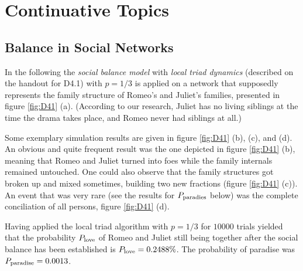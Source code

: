 \documentclass{scrartcl}
\begin{document}


\clearpage
\setcounter{section}{3}
\section{Continuative Topics}
\subsection{Balance in Social Networks}
In the following the \emph{social balance model} with \emph{local triad
dynamics} (described on the handout for D4.1) with $p = 1/3$ is applied on
a network that supposedly represents the family structure of Romeo's and
Juliet's families, presented in figure \ref{fig:D41} (a).  (According to
our research, Juliet has no living siblings at the time the drama takes
place, and Romeo never had siblings at all.)

Some exemplary simulation results are given in figure \ref{fig:D41} (b),
(c), and (d).
An obvious and quite frequent result was the one depicted in figure \ref{fig:D41}
(b), meaning that Romeo and Juliet turned into foes while the family
internals remained untouched.  One could also observe that the family
structures got broken up and mixed sometimes, building two new fractions
(figure \ref{fig:D41} (c)). An event that was very rare (see the results for
$P_{\mathrm{paradies}}$ below) was the complete conciliation of all persons,
figure \ref{fig:D41} (d).

Having applied the local triad algorithm with $p = 1/3$ for $10000$ trials
yielded that the probability $P_{\mathrm{love}}$ of Romeo and Juliet still being together after
the social balance has been established is $P_{\mathrm{love}} = 0.2488\%$.
The probability of paradise was $P_{\mathrm{paradise}} = 0.0013$.
\end{document}
